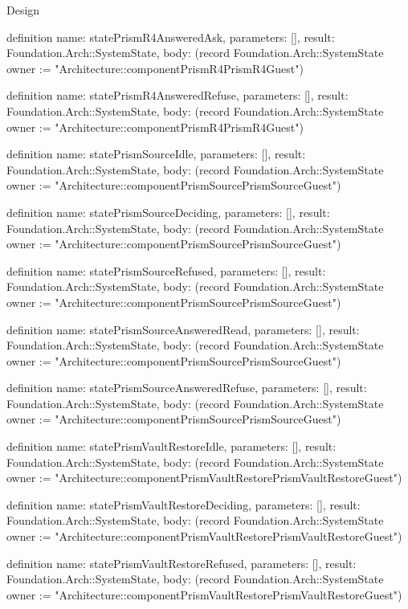 \begin{lexlean}{Design}
\begin{semanticmodule}
definition{
  name: statePrismR4AnsweredAsk,
  parameters: [],
  result: Foundation.Arch::SystemState,
  body: (record Foundation.Arch::SystemState {owner := "Architecture::componentPrismR4PrismR4Guest"})
}

definition{
  name: statePrismR4AnsweredRefuse,
  parameters: [],
  result: Foundation.Arch::SystemState,
  body: (record Foundation.Arch::SystemState {owner := "Architecture::componentPrismR4PrismR4Guest"})
}

definition{
  name: statePrismSourceIdle,
  parameters: [],
  result: Foundation.Arch::SystemState,
  body: (record Foundation.Arch::SystemState {owner := "Architecture::componentPrismSourcePrismSourceGuest"})
}

definition{
  name: statePrismSourceDeciding,
  parameters: [],
  result: Foundation.Arch::SystemState,
  body: (record Foundation.Arch::SystemState {owner := "Architecture::componentPrismSourcePrismSourceGuest"})
}

definition{
  name: statePrismSourceRefused,
  parameters: [],
  result: Foundation.Arch::SystemState,
  body: (record Foundation.Arch::SystemState {owner := "Architecture::componentPrismSourcePrismSourceGuest"})
}

definition{
  name: statePrismSourceAnsweredRead,
  parameters: [],
  result: Foundation.Arch::SystemState,
  body: (record Foundation.Arch::SystemState {owner := "Architecture::componentPrismSourcePrismSourceGuest"})
}

definition{
  name: statePrismSourceAnsweredRefuse,
  parameters: [],
  result: Foundation.Arch::SystemState,
  body: (record Foundation.Arch::SystemState {owner := "Architecture::componentPrismSourcePrismSourceGuest"})
}

definition{
  name: statePrismVaultRestoreIdle,
  parameters: [],
  result: Foundation.Arch::SystemState,
  body: (record Foundation.Arch::SystemState {owner := "Architecture::componentPrismVaultRestorePrismVaultRestoreGuest"})
}

definition{
  name: statePrismVaultRestoreDeciding,
  parameters: [],
  result: Foundation.Arch::SystemState,
  body: (record Foundation.Arch::SystemState {owner := "Architecture::componentPrismVaultRestorePrismVaultRestoreGuest"})
}

definition{
  name: statePrismVaultRestoreRefused,
  parameters: [],
  result: Foundation.Arch::SystemState,
  body: (record Foundation.Arch::SystemState {owner := "Architecture::componentPrismVaultRestorePrismVaultRestoreGuest"})
}


\end{semanticmodule}
\end{lexlean}
